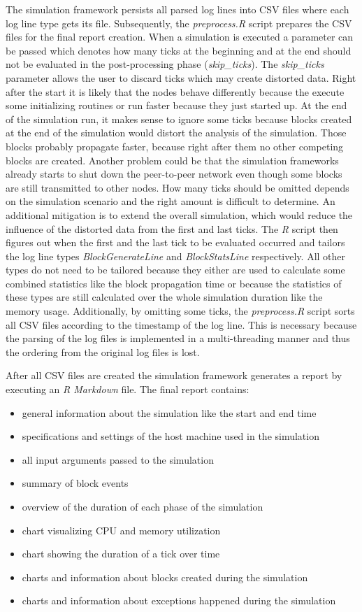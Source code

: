 The simulation framework persists all parsed log lines into CSV files where each log line type gets its file.
Subsequently, the \textit{preprocess.R} script prepares the CSV files for the final report creation.
When a simulation is executed a parameter can be passed which denotes how many ticks at the beginning and at the end should not be evaluated in the post-processing phase (\textit{skip\_ticks}).
The \textit{skip\_ticks} parameter allows the user to discard ticks which may create distorted data.
Right after the start it is likely that the nodes behave differently because the execute some initializing routines or run faster because they just started up.
At the end of the simulation run, it makes sense to ignore some ticks because blocks created at the end of the simulation would distort the analysis of the simulation.
Those blocks probably propagate faster, because right after them no other competing blocks are created.
Another problem could be that the simulation frameworks already starts to shut down the peer-to-peer network even though some blocks are still transmitted to other nodes.
How many ticks should be omitted depends on the simulation scenario and the right amount is difficult to determine.
An additional mitigation is to extend the overall simulation, which would reduce the influence of the distorted data from the first and last ticks.
The \textit{R} script then figures out when the first and the last tick to be evaluated occurred and tailors the log line types \textit{BlockGenerateLine} and \textit{BlockStatsLine} respectively.
All other types do not need to be tailored because they either are used to calculate some combined statistics like the block propagation time or because the statistics of these types are still calculated over the whole simulation duration like the memory usage.
Additionally, by omitting some ticks, the \textit{preprocess.R} script sorts all CSV files according to the timestamp of the log line.
This is necessary because the parsing of the log files is implemented in a multi-threading manner and thus the ordering from the original log files is lost.

After all CSV files are created the simulation framework generates a report by executing an \textit{R Markdown} file.
The final report contains:
\begin{itemize}
	\item general information about the simulation like the start and end time
	\item specifications and settings of the host machine used in the simulation
	\item all input arguments passed to the simulation
	\item summary of block events
	\item overview of the duration of each phase of the simulation
	\item chart visualizing CPU and memory utilization
	\item chart showing the duration of a tick over time
	\item charts and information about blocks created during the simulation
	\item charts and information about exceptions happened during the simulation
\end{itemize}

